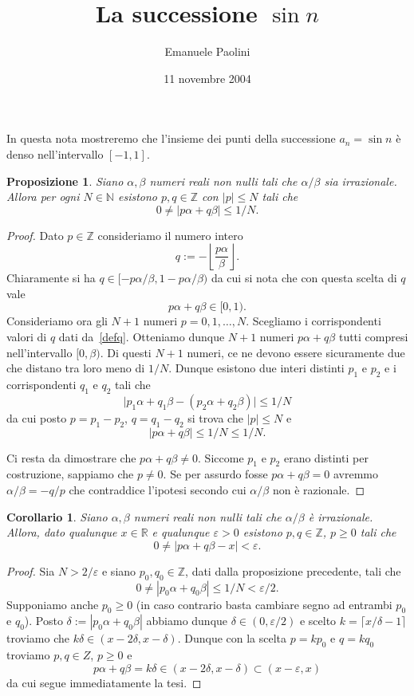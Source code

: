 \documentclass[italian,a4paper]{article}
\title{La successione $\sin n$}
\author{Emanuele Paolini}
\date{11 novembre 2004}
\newcommand{\R}{\mathbb{R}}
\newcommand{\N}{\mathbb{N}}
\newcommand{\Z}{\mathbb{Z}}
\renewcommand{\epsilon}{\varepsilon}
\newtheorem{proposition}[theorem]{Proposizione}
\newtheorem{corollary}[theorem]{Corollario}
\begin{document}
\maketitle
In questa nota mostreremo che l'insieme dei punti della successione $a_n=\sin n$ \`e denso nell'intervallo $[-1,1]$.

\begin{proposition}
Siano $\alpha,\beta$ numeri reali non nulli tali che $\alpha/\beta$
sia irrazionale. Allora per ogni $N\in\N$ esistono $p,q\in\Z$ con
$|p|\le N$ tali che
\[
  0 \neq |p\alpha + q\beta| \le 1/N.
\]  
\end{proposition}
\begin{proof}
Dato $p\in \Z$ consideriamo il numero intero
\begin{equation}\label{defq}
   q := -\left\lfloor\frac{p\alpha}\beta\right\rfloor.
\end{equation}
Chiaramente si ha $q\in[-p\alpha/\beta,1-p\alpha/\beta)$ da cui si
nota che con questa scelta di $q$ vale
\[
p\alpha + q\beta \in [0,1).
\]
Consideriamo ora gli $N+1$ numeri
$p=0,1,\ldots,N$. Scegliamo i corrispondenti valori di $q$ dati
da~\eqref{defq}.
Otteniamo dunque $N+1$ numeri $p\alpha + q\beta$ tutti compresi
nell'intervallo $[0,\beta)$. 
Di questi $N+1$ numeri, ce ne devono essere sicuramente due che
distano tra loro meno di $1/N$. Dunque esistono due interi distinti
$p_1$ e $p_2$ e i corrispondenti $q_1$ e $q_2$ tali che
\[
  \lvert p_1\alpha+q_1\beta - (p_2\alpha + q_2\beta)\rvert \le 1/N
\]
da cui posto $p=p_1-p_2$, $q=q_1-q_2$ si trova che $|p|\le N$ e 
\[
  \lvert p\alpha + q\beta\rvert \le 1/N \le 1/N.
\]

Ci resta da dimostrare che $p\alpha + q\beta \neq 0$. Siccome $p_1$ e
$p_2$ erano distinti per costruzione, sappiamo che $p\neq 0$. Se per
assurdo fosse $p\alpha+q\beta =0 $ avremmo $\alpha/\beta=-q/p$ che
contraddice l'ipotesi secondo cui $\alpha/\beta$ non \`e razionale.
\end{proof}
\begin{corollary}
Siano $\alpha,\beta$ numeri reali non nulli tali che $\alpha/\beta$
\`e irrazionale. Allora, dato qualunque $x\in\R$ e qualunque
$\epsilon>0$ esistono $p,q\in \Z$, $p\ge 0$ tali che 
\[
  0\neq \lvert p\alpha+q\beta - x\rvert < \epsilon.
\]
\end{corollary}
\begin{proof}
Sia $N>2/\epsilon$ e siano $p_0,q_0\in \Z$, 
dati dalla proposizione precedente, tali che
\[
  0\neq |p_0 \alpha + q_0\beta| \le 1/N < \epsilon/2.
\]
Supponiamo anche $p_0\ge 0$ (in caso contrario basta cambiare segno ad
entrambi $p_0$ e $q_0$).
Posto $\delta:= |p_0 \alpha + q_0\beta|$ abbiamo dunque
$\delta\in(0,\epsilon/2)$ e scelto $k=\lceil x/\delta -1\rceil$ troviamo
che $k\delta\in(x-2\delta,x-\delta)$. Dunque con la scelta $p=kp_0$ e
$q=kq_0$ troviamo $p,q\in Z$, $p\ge 0$ e 
\[
  p\alpha + q\beta = k\delta \in (x-2\delta,x-\delta)\subset (x-\epsilon,x)
\]
da cui segue immediatamente la tesi.
\end{proof}
\end{document}
